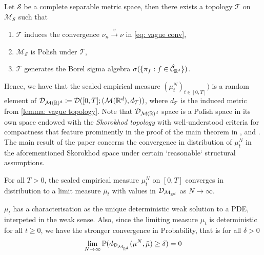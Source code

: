 \documentclass{article}
\begin{document}
\begin{boxlemma}\label{lemma: vague topology}
Let $  \mathcal{S}$ be a complete separable metric space, then there exists a topology $  \mathcal{T}$ on $  \mathcal{M}_{ \mathcal{ S}}$ such that
\begin{enumerate}
\item $ \mathcal{T}$ induces the convergence $ \nu_{n}\stackrel{v}{\longrightarrow}\nu$ in \ref{eq: vague conv},
\item $ \mathcal{M}_{ \mathcal{S}}$ is Polish under $  \mathcal{T}$,
\item $  \mathcal{T}$ generates the Borel sigma algebra $\sigma(\{\pi_{f}:f\in \hat {\mathcal{C}}_{\mathbb{R}^{d}}\})$.
\end{enumerate}

\end{boxlemma}

Hence, we have that the scaled empirical measure $ (\mu^{N}_{t})_{t\in [0,T]})$ is a random element of $ \mathcal{D}_{ \mathcal{M}(\mathbb{R})^{d}} \coloneqq \mathcal{D}([0,T]; ( \mathcal{M}(\mathbb{R}^{d}), d_\mathcal{T}))$, where $d_ \mathcal{T}$ is the induced metric from \ref{lemma: vague topology}. Note that $  \mathcal{D}_{ \mathcal{M}(\mathbb{R})^{d}}$ space is a Polish space in its own space endowed with the \textit{Skorokhod topology} with well-understood criteria for compactness that feature prominently in the proof of the main theorem in \cite{sirignano2019meanfieldanalysislln}, and \cite{sirignano2019meanfieldanalysisclt}.\\

The main result of the paper \cite{sirignano2019meanfieldanalysislln} concerns the convergence in distribution of $ \mu^{N}_{t}$ in the aforementioned Skorokhod space under certain `reasonable` structural assumptions.

\begin{theorem}\label{thm: spilopoulos lln}
	For all $ T>0$, the scaled empirical measure $ \mu^{N}_{t}$ on $ [0,T]$ converges in distribution to a
 limit measure $ \bar{\mu}_{t}$ with values in $  \mathcal{D}_{\mathcal{M}_{\mathbb{R}^{d}}} $ as $ N\to \infty$.
\end{theorem}

\begin{remark}
    $ \mu_{t}$ has a characterisation as the unique deterministic weak solution to a PDE, interpeted in the weak sense. Also, since the limiting measure $ \mu_{t}$ is deterministic for all $ t\geq 0$, we have the stronger convergence in Probability, that is for all $ \delta >0$
    \[
    \displaystyle \lim_{N\to \infty}\mathbb{P}(d_{  \mathcal{D}_{\mathcal{M}_{\mathbb{R}^{d}}} }(\mu^{N}, \bar{\mu})\geq \delta) = 0 
    \]
    
\end{remark}
\end{document}
